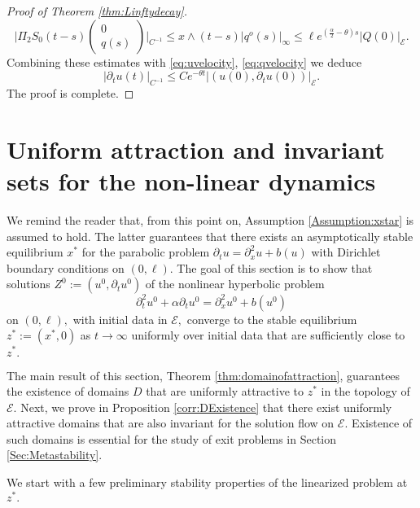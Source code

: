 \documentclass[10pt, reqno]{amsart}
\newcommand{\e}{\mathcal{E}}
\theoremstyle{definition}
\numberwithin{lem}{section}
\numberwithin{cor}{section}
\numberwithin{prop}{section}
\numberwithin{thm}{section}
\numberwithin{dfn}{section}
\begin{document}
\begin{proof}[Proof of Theorem \ref{thm:Linftydecay}]
$$ \bigg|\Pi_2S_0(t-s)\begin{pmatrix} 0 \\ q(s) \end{pmatrix}\bigg|_{C^{-1}}\leq  x\wedge (t-s) |q^o(s)|_\infty\leq \ell e^{(\frac{\alpha}{2}-\theta) s}|Q(0)|_\e.$$
Combining these estimates with \eqref{eq:uvelocity}, \eqref{eq:qvelocity} we deduce
$$ |\partial_t u(t)|_{C^{-1}}\leq C e^{-\theta t}|(u(0),\partial_tu(0))|_\e.   $$
The proof is complete.
\end{proof}









 \section{Uniform attraction and invariant sets for the non-linear dynamics}\label{sec:NonlinearStability}

We remind the reader that, from this point on, Assumption \ref{Assumption:xstar} is assumed to hold. The latter guarantees that there exists an asymptotically stable equilibrium $x^*$ for the parabolic problem $\partial_tu=\partial_x^2u+b(u)$ with Dirichlet boundary conditions on $(0,\ell).$ The goal of this section is to show that solutions $Z^0:=(u^0, \partial_tu^0)$ of the nonlinear hyperbolic problem
\begin{equation}\label{eq:deterministicnonlinearwave}
\partial_t^2u^0+\alpha\partial_tu^0=\partial_x^2u^0+b(u^0) 
\end{equation}
on $(0,\ell),$ with initial data in $\e,$  converge to the stable equilibrium $z^*:=(x^*, 0)$ as $t\to\infty$ uniformly over initial data that are sufficiently close to $z^*.$


The main result of this section, Theorem \ref{thm:domainofattraction}, guarantees the existence of domains $D$ that are uniformly attractive to $z^*$ in the topology of $\e.$ Next, we prove in Proposition \ref{corr:DExistence} that there exist uniformly attractive domains that are also invariant for the solution flow on $\e.$ Existence of such domains is essential for the study of exit problems in Section \ref{Sec:Metastability}. 

We start with a few preliminary stability properties of the linearized problem at $z^*.$
\end{document}

